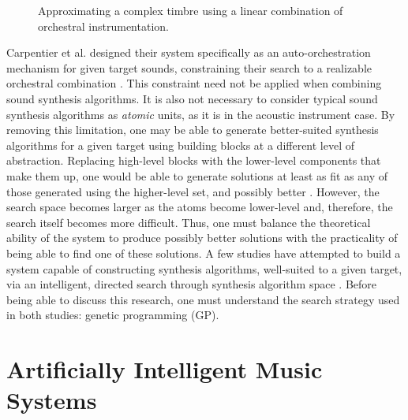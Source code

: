 \documentclass[a4paper,12pt]{report} 	%
\numberwithin{figure}{chapter}
\numberwithin{table}{chapter}
\numberwithin{equation}{chapter}
\begin{document}
\begin{flushleft}
\begin{figure}[h!]
\begin{center}
\caption[Searching for an Appropriate Linear Combination of Orchestral Instruments]{Approximating a complex timbre using a linear combination of orchestral instrumentation.}
\end{center}
\end{figure}
Carpentier et al. designed their system specifically as an auto-orchestration mechanism for given target sounds, constraining their search to a realizable orchestral combination \cite{Carpentier:2010fh}. This constraint need not be applied when combining sound synthesis algorithms. It is also not necessary to consider typical sound synthesis algorithms as \emph{atomic} units, as it is in the acoustic instrument case. By removing this limitation, one may be able to generate better-suited synthesis algorithms for a given target using building blocks at a different level of abstraction. Replacing high-level blocks with the lower-level components that make them up, one would be able to generate solutions at least as fit as any of those generated using the higher-level set, and possibly better \cite[p. 2]{Garcia:2000th}. However, the search space becomes larger as the atoms become lower-level and, therefore, the search itself becomes more difficult. Thus, one must balance the theoretical ability of the system to produce possibly better solutions with the practicality of being able to find one of these solutions. A few studies have attempted to build a system capable of constructing synthesis algorithms, well-suited to a given target, via an intelligent, directed search through synthesis algorithm space \cite{Wehn:1998bh, Garcia:2000th, Garcia:2002cq}. Before being able to discuss this research, one must understand the search strategy used in both studies: genetic programming (GP).

\section{Artificially Intelligent Music Systems}


\end{flushleft}
\end{document}
